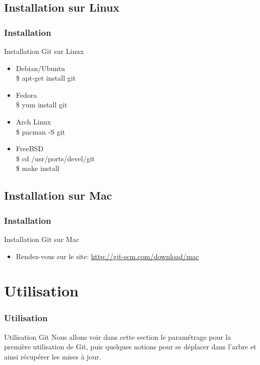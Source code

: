\documentclass{beamer}
\begin{document}

\subsection{Installation sur Linux}\label{Installation sur Linux}
\begin{frame}
\frametitle{Installation}
\begin{block}{Installation Git sur Linux}
\begin{itemize}
\item Debian/Ubuntu \\ \$ apt-get install git
\end{itemize}
\begin{itemize}
\item Fedora  \\ \$ yum install git
\end{itemize}
\begin{itemize}
\item Arch Linux  \\ \$ pacman -S git
\end{itemize}
\begin{itemize}
\item FreeBSD \\ \$ cd /usr/ports/devel/git\\ \$ make install
\end{itemize}

\end{block}
\end{frame}


\subsection{Installation sur Mac}\label{Installation sur Mac}
\begin{frame}
\frametitle{Installation}
\begin{block}{Installation Git sur Mac}
\begin{itemize}
\item Rendez-vous sur le site: \href{http://git-scm.com/download/mac}{http://git-scm.com/download/mac}
\end{itemize}
\end{block}
\end{frame}


\section{Utilisation}
\begin{frame}
\frametitle{Utilisation}
\begin{block}{Utilisation Git}
Nous allons voir dans cette section le param\'{e}trage pour la premi\`{e}re utilisation de Git, puis quelques notions pour se d\'{e}placer dans l'arbre et ainsi r\'{e}cup\'{e}rer les mises \`{a} jour.
\end{block}
\end{frame}
\end{document}
